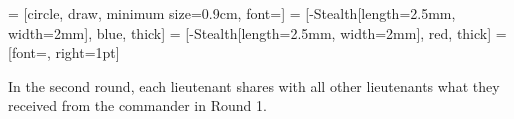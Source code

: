 
 = [circle, draw, minimum size=0.9cm, font=\small]
 = [-{Stealth[length=2.5mm, width=2mm]}, blue, thick] %
 = [-{Stealth[length=2.5mm, width=2mm]}, red, thick]  %
 = [font=\scriptsize, right=1pt]




In the second round, each lieutenant shares with all other lieutenants what they received from the commander in Round 1.

